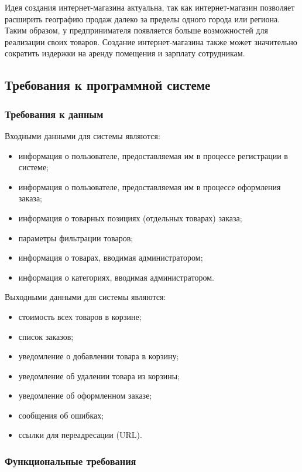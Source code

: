 Идея создания интернет-магазина актуальна, так как интернет-магазин позволяет расширить географию продаж далеко за пределы одного города или региона. Таким образом, у предпринимателя появляется больше возможностей для реализации своих товаров. Создание интернет-магазина также может значительно сократить издержки на аренду помещения и зарплату сотрудникам.

\subsection{Требования к программной системе}

\subsubsection{Требования к данным}
Входными данными для системы являются:
\begin{itemize}
	\item информация о пользователе, предоставляемая им в процессе регистрации в системе;
	\item информация о пользователе, предоставляемая им в процессе оформления заказа;
	\item информация о товарных позициях (отдельных товарах) заказа;
	\item параметры фильтрации товаров;
	\item информация о товарах, вводимая администратором;
	\item информация о категориях, вводимая администратором.
\end{itemize}

Выходными данными для системы являются:
\begin{itemize}
	\item стоимость всех товаров в корзине;
	\item список заказов;
	\item уведомление о добавлении товара в корзину;
	\item уведомление об удалении товара из корзины;
	\item уведомление об оформленном заказе;
	\item сообщения об ошибках;
	\item ссылки для переадресации (URL).
\end{itemize}


\subsubsection{Функциональные требования}


